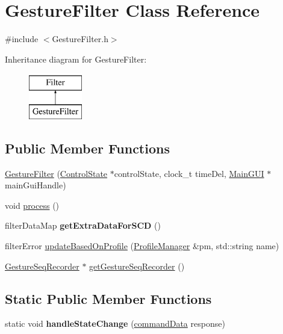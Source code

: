 \hypertarget{class_gesture_filter}{\section{Gesture\+Filter Class Reference}
\label{class_gesture_filter}
}


{\ttfamily \#include $<$Gesture\+Filter.\+h$>$}

Inheritance diagram for Gesture\+Filter\+:\begin{figure}[H]
\begin{center}
\leavevmode
\includegraphics[height=2.000000cm]{class_gesture_filter}
\end{center}
\end{figure}
\subsection*{Public Member Functions}
\begin{DoxyCompactItemize}
\item 
\hyperlink{class_gesture_filter_a7ec8f885370e67e108bd1f767e9f2769}{Gesture\+Filter} (\hyperlink{class_control_state}{Control\+State} $\ast$control\+State, clock\+\_\+t time\+Del, \hyperlink{class_main_g_u_i}{Main\+G\+U\+I} $\ast$main\+Gui\+Handle)
\item 
void \hyperlink{class_gesture_filter_a73231d8753e5d4cf04a208131819ad2c}{process} ()
\item 
\hypertarget{class_gesture_filter_a836ba016c9b8edf33c4511881218f7cf}{filter\+Data\+Map {\bfseries get\+Extra\+Data\+For\+S\+C\+D} ()}\label{class_gesture_filter_a836ba016c9b8edf33c4511881218f7cf}

\item 
filter\+Error \hyperlink{class_gesture_filter_a65031496d7c7da33003499c75a63119c}{update\+Based\+On\+Profile} (\hyperlink{class_profile_manager}{Profile\+Manager} \&pm, std\+::string name)
\item 
\hyperlink{class_gesture_seq_recorder}{Gesture\+Seq\+Recorder} $\ast$ \hyperlink{class_gesture_filter_af77130b2c3dbaa45a78ea6aaa39152dd}{get\+Gesture\+Seq\+Recorder} ()
\end{DoxyCompactItemize}
\subsection*{Static Public Member Functions}
\begin{DoxyCompactItemize}
\item 
\hypertarget{class_gesture_filter_ac778bc1d58a29b60b644252818a7d85f}{static void {\bfseries handle\+State\+Change} (\hyperlink{structcommand_data}{command\+Data} response)}\label{class_gesture_filter_ac778bc1d58a29b60b644252818a7d85f}

\end{DoxyCompactItemize}

